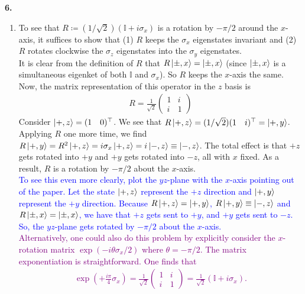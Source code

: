 \documentclass{article}
\theoremstyle{definition}
\newcommand{\f}[2]{\frac{#1}{#2}}
\newcommand{\lp}{\left(}
\newcommand{\rp}{\right)}
\begin{document}
\noindent \textbf{6.}
\begin{enumerate}[label=(\alph*)]
	\item To see that $R \coloneqq (1/\sqrt{2})(\mathbb{I} + i\sigma_x)$ is a rotation by $-\pi/2$ around the $x$-axis, it suffices to show that (1) $R$ keeps the $\sigma_x$ eigenstates invariant and (2) $R$ rotates clockwise the $\sigma_z$ eigenstates into the $\sigma_y$ eigenstates. \\
	
	It is clear from the definition of  $R$ that $R\ket{\pm ,x} = \ket{\pm,x}$ (since $\ket{\pm, x}$ is a simultaneous eigenket of both $\mathbb{I}$ and $\sigma_x$). So $R$ keeps the $x$-axis the same. Now, the matrix representation of this operator in the $z$ basis is 
	\begin{align*}
	R = \f{1}{\sqrt{2}} \begin{pmatrix}
	1 & i \\ i & 1
	\end{pmatrix}
	\end{align*}
	Consider $\ket{+,z} = (1\quad0)^\top$. We see that $R \ket{+,z} =  (1/\sqrt{2})(1 \quad i)^\top = \ket{+,y}$. Applying $R$ one more time, we find $R \ket{+ ,y} =  R^2 \ket{+,z} = i\sigma_x \ket{+,z} = i\ket{-,z} \equiv \ket{-,z}$. The total effect is that $+z$ gets rotated into $+y$ and $+y$ gets rotated into $-z$, all with $x$ fixed. As a result, $R$ is a rotation by $-\pi/2$ about the $x$-axis.  \\
	
	\textcolor{blue}{To see this even more clearly, plot the $yz$-plane with the $x$-axis pointing out of the paper. Let the state $\ket{+,z}$ represent the $+z$ direction and $\ket{+,y}$ represent the $+y$ direction. Because $R\ket{+,z} = \ket{+,y}$, $R\ket{+,y} \equiv \ket{-,z}$ and $R\ket{\pm ,x} = \ket{\pm,x}$, we have  that $+z$ gets sent to $+y$, and $+y$ gets sent to $-z$. So, the $yz$-plane gets rotated by $-\pi/2$ about the $x$-axis. }\\
	
	
	\textcolor{purple}{Alternatively, one could also do this problem by explicitly consider the $x$-rotation matrix $\exp(-i\theta\sigma_x/2)$ where $\theta = -\pi/2$. The matrix exponentiation is straightforward. One finds that
	\begin{align*}
	\exp\lp +\f{i\pi}{4} \sigma_x \rp = \f{1}{\sqrt{2}}\begin{pmatrix}
	1 & i \\ i & 1
	\end{pmatrix} = \f{1}{\sqrt{2}}\lp \mathbb{I} + i\sigma_x \rp.
	\end{align*}
	}	
	

\end{enumerate}
\end{document}
